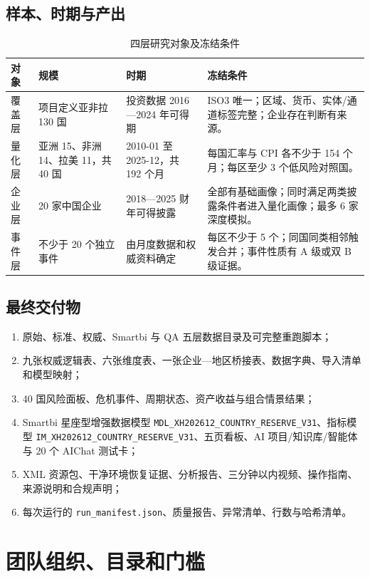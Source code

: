 \documentclass[UTF8,fontset=windows,12pt,openany]{ctexbook}
\newcommand{\Field}[1]{{\small\nolinkurl{#1}}}
\newcommand{\File}[1]{{\small\nolinkurl{#1}}}
\begin{document}
\section{样本、时期与产出}

\begin{longtable}{p{3.1cm}p{3.2cm}p{3.0cm}p{4.5cm}}
\caption{四层研究对象及冻结条件}\label{tab:sample-contract}\\
\toprule
\textbf{对象} & \textbf{规模} & \textbf{时期} & \textbf{冻结条件}\\
\midrule
覆盖层 & 项目定义亚非拉 130 国 & 投资数据 2016—2024 年可得期 & ISO3 唯一；区域、货币、实体/通道标签完整；企业存在判断有来源。\\
量化层 & 亚洲 15、非洲 14、拉美 11，共 40 国 & 2010-01 至 2025-12，共 192 个月 & 每国汇率与 CPI 各不少于 154 个月；每区至少 3 个低风险对照国。\\
企业层 & 20 家中国企业 & 2018—2025 财年可得披露 & 全部有基础画像；同时满足两类披露条件者进入量化画像；最多 6 家深度模拟。\\
事件层 & 不少于 20 个独立事件 & 由月度数据和权威资料确定 & 每区不少于 5 个；同国同类相邻触发合并；事件性质有 A 级或双 B 级证据。\\
\bottomrule
\end{longtable}

\section{最终交付物}

\begin{enumerate}
  \item 原始、标准、权威、Smartbi 与 QA 五层数据目录及可完整重跑脚本；
  \item 九张权威逻辑表、六张维度表、一张企业—地区桥接表、数据字典、导入清单和模型映射；
  \item 40 国风险面板、危机事件、周期状态、资产收益与组合情景结果；
  \item Smartbi 星座型增强数据模型 \Field{MDL_XH202612_COUNTRY_RESERVE_V31}、指标模型 \Field{IM_XH202612_COUNTRY_RESERVE_V31}、五页看板、AI 项目/知识库/智能体与 20 个 AIChat 测试卡；
  \item XML 资源包、干净环境恢复证据、分析报告、三分钟以内视频、操作指南、来源说明和合规声明；
  \item 每次运行的 \File{run_manifest.json}、质量报告、异常清单、行数与哈希清单。
\end{enumerate}

\chapter{团队组织、目录和门槛}
\end{document}
